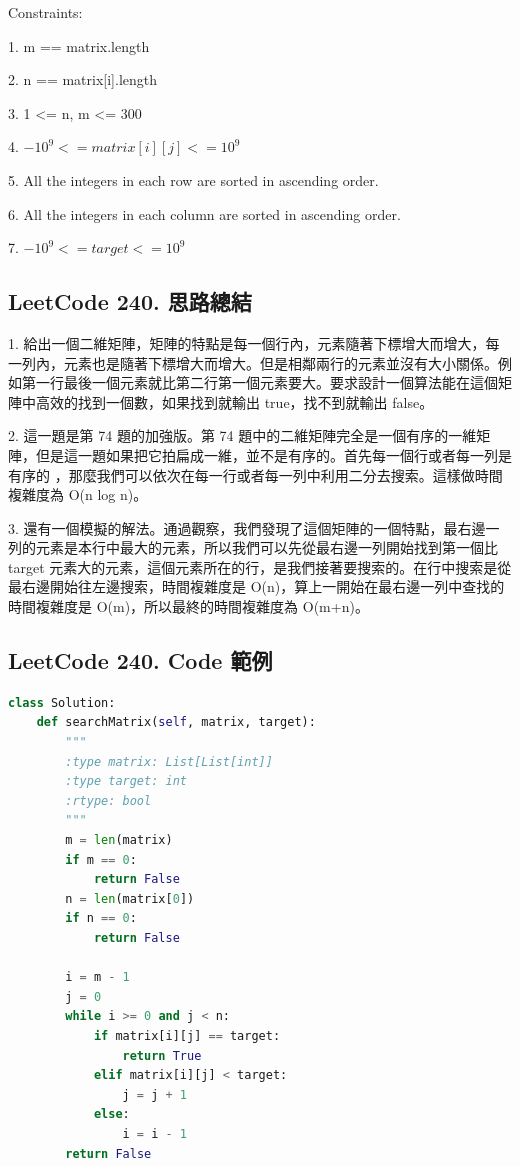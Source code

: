 \documentclass[10pt,UTF8]{ctexart}
\begin{document}
Constraints:

1. m == matrix.length

2. n == matrix[i].length

3. 1 <= n, m <= 300

4. $-10^{9} <= matrix[i][j] <= 10^{9}$

5. All the integers in each row are sorted in ascending order.

6. All the integers in each column are sorted in ascending order.

7. $-10^{9} <= target <= 10^{9}$


\subsection{LeetCode 240. 思路總結}

1. 給出一個二維矩陣，矩陣的特點是每一個行內，元素隨著下標增大而增大，每一列內，元素也是隨著下標增大而增大。但是相鄰兩行的元素並沒有大小關係。例如第一行最後一個元素就比第二行第一個元素要大。要求設計一個算法能在這個矩陣中高效的找到一個數，如果找到就輸出 true，找不到就輸出 false。

2. 這一題是第 74 題的加強版。第 74 題中的二維矩陣完全是一個有序的一維矩陣，但是這一題如果把它拍扁成一維，並不是有序的。首先每一個行或者每一列是有序的 ，那麼我們可以依次在每一行或者每一列中利用二分去搜索。這樣做時間複雜度為 O(n log n)。

3. 還有一個模擬的解法。通過觀察，我們發現了這個矩陣的一個特點，最右邊一列的元素是本行中最大的元素，所以我們可以先從最右邊一列開始找到第一個比 target 元素大的元素，這個元素所在的行，是我們接著要搜索的。在行中搜索是從最右邊開始往左邊搜索，時間複雜度是 O(n)，算上一開始在最右邊一列中查找的時間複雜度是 O(m)，所以最終的時間複雜度為 O(m+n)。

\subsection{LeetCode 240. Code 範例}

\begin{lstlisting}[language={python}]
class Solution:
    def searchMatrix(self, matrix, target):
        """
        :type matrix: List[List[int]]
        :type target: int
        :rtype: bool
        """
        m = len(matrix)
        if m == 0:
            return False
        n = len(matrix[0])
        if n == 0:
            return False

        i = m - 1
        j = 0
        while i >= 0 and j < n:
            if matrix[i][j] == target:
                return True
            elif matrix[i][j] < target:
                j = j + 1
            else:
                i = i - 1
        return False
\end{lstlisting}
\end{document}
